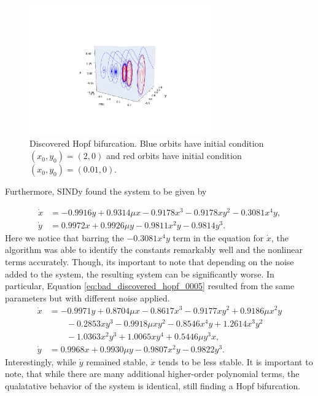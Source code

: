 \documentclass[10pt]{paper}
\begin{document}
\begin{figure}[h]
	\caption{Discovered Hopf bifurcation. Blue orbits have initial condition $(x_0, y_0) = (2,0)$ and red orbits have initial condition $(x_0, y_0) = (0.01, 0)$.}
	\label{fig:discovered_hopf_0005}

	\centering 

	\includegraphics[width = 0.7\textwidth, trim={4.3cm, 1.9cm, 4.3cm, 3.5cm}, clip]{found_hopf_bifurcation_0005.pdf}
\end{figure}

Furthermore, SINDy found the system to be given by 

\begin{equation}\label{eq:discovered_hopf_0005}
	\begin{split}
		\dot x &= -0.9916y + 0.9314\mu x - 0.9178x^3 - 0.9178xy^2 - 0.3081x^4y, \\
		\dot y &= 0.9972x + 0.9926\mu y - 0.9811x^2y - 0.9814y^3.
	\end{split}
\end{equation}
Here we notice that barring the $-0.3081x^4y$ term in the equation for $\dot x$, the algorithm was able to identify the constants remarkably well and the nonlinear terms accurately. 
Though, its important to note that depending on the noise added to the system, the resulting system can be significantly worse. In particular, Equation \ref{eq:bad_discovered_hopf_0005} resulted from the same parameters but with different noise applied. 
\begin{equation}\label{eq:bad_discovered_hopf_0005}
	\begin{split}
		\dot x &= -0.9971y + 0.8704\mu x - 0.8617x^3 - 0.9177xy^2 + 0.9186\mu x^2 y   \\
		&\qquad - 0.2853 xy^3- 0.9918 \mu x y^2 - 0.8546 x^4y + 1.2614 x^3y^2  \\ &\qquad - 1.0363 x^2y^3 + 1.0065 xy^4+ 0.5446\mu y^3 x, \\
		\dot y &= 0.9968x + 0.9930\mu y - 0.9807x^2y - 0.9822 y^3.
	\end{split}
\end{equation}
Interestingly, while $\dot y$ remained stable, $\dot x$ tends to be less stable. It is important to note, that while there are many additional higher-order polynomial terms, the qualatative behavior of the system is identical, still finding a Hopf bifurcation.
\end{document}
